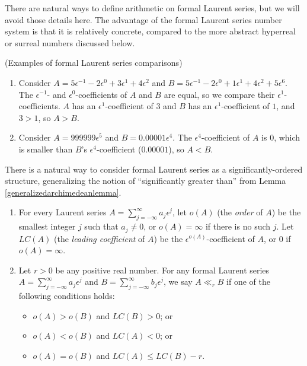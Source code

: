 \documentclass[twoside,11pt]{article}
\begin{document}
There are natural ways to define arithmetic on formal Laurent series, but we will
avoid those details here.
The advantage of the formal Laurent series number system is that it is
relatively concrete, compared to the more abstract hyperreal or surreal numbers
discussed below.

\begin{example}
(Examples of formal Laurent series comparisons)
\begin{enumerate}
    \item Consider $A=5\epsilon^{-1}-2\epsilon^{0}+3\epsilon^1+4\epsilon^2$ and
    $B=5\epsilon^{-1}-2\epsilon^0+1\epsilon^1+4\epsilon^2+5\epsilon^6$.
    The $\epsilon^{-1}$- and $\epsilon^0$-coefficients of $A$ and $B$ are equal, so
    we compare their $\epsilon^1$-coefficients. $A$ has an $\epsilon^1$-coefficient of $3$ and
    $B$ has an $\epsilon^1$-coefficient of $1$, and $3>1$, so $A>B$.
    \item Consider $A=999999\epsilon^5$ and $B=0.00001\epsilon^{4}$.
    The $\epsilon^{4}$-coefficient of $A$ is $0$, which is smaller than
    $B$'s $\epsilon^{4}$-coefficient ($0.00001$), so $A<B$.
\end{enumerate}
\end{example}

There is a natural way to consider formal Laurent series as a significantly-ordered
structure, generalizing the notion of ``significantly greater than'' from
Lemma \ref{generalizedarchimedeanlemma}.

\begin{definition}
\label{significantorderednessoflaurent}
\begin{enumerate}
\item
For every Laurent series $A=\sum_{j=-\infty}^\infty a_j\epsilon^j$,
let $o(A)$ (the \emph{order} of $A$)
be the smallest integer $j$ such that $a_j\not=0$, or $o(A)=\infty$ if
there is no such $j$.
Let $LC(A)$ (the \emph{leading coefficient} of $A$)
be the $\epsilon^{o(A)}$-coefficient of $A$, or $0$ if $o(A)=\infty$.
\item
Let $r>0$ be any positive real number.
For any formal Laurent series $A=\sum_{j=-\infty}^\infty a_j\epsilon^j$
and $B=\sum_{j=-\infty}^\infty b_j\epsilon^j$,
we say $A\ll_r B$ if one of the following conditions holds:
    \begin{itemize}
        \item
        $o(A)>o(B)$ and $LC(B)>0$; or
        \item
        $o(A)<o(B)$ and $LC(A)<0$; or
        \item
        $o(A)=o(B)$ and $LC(A)\leq LC(B)-r$.
    \end{itemize}
\end{enumerate}
\end{definition}
\end{document}
